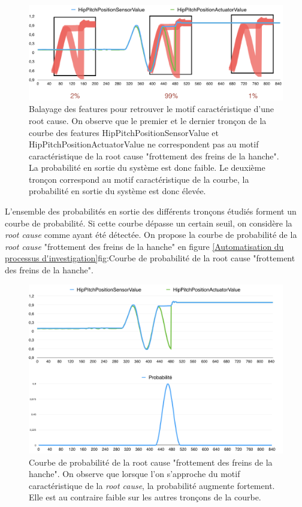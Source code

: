 \begin{figure}[h]
	\centering\includegraphics[width=12cm]{images/balayage_motif.png}
	\caption[Balayage des features pour retrouver le motif caractéristique d'une root cause]{Balayage des features pour retrouver le motif caractéristique d'une root cause. On observe que le premier et le dernier tronçon de la courbe des features HipPitchPositionSensorValue et  HipPitchPositionActuatorValue ne correspondent pas au motif caractéristique de la root cause "frottement des freins de la hanche". La probabilité en sortie du système est donc faible. Le deuxième tronçon correspond au motif caractéristique de la courbe, la probabilité en sortie du système est donc élevée.}
	\label{fig:Balayage des features pour retrouver le motif caractéristique d'une root cause}
\end{figure}

L'ensemble des probabilités en sortie des différents tronçons étudiés forment un courbe de probabilité. Si cette courbe dépasse un certain seuil, on considère la \emph{root cause} comme ayant été détectée. On propose la courbe de probabilité de la \emph{root cause} "frottement des freins de la hanche" en figure 	\ref{Automatisation du processus d'investigation}{fig:Courbe de probabilité de la root cause "frottement des freins de la hanche"}.

\begin{figure}[h]
	\centering\includegraphics[width=12cm]{images/proba_motif.png}
	\caption[Courbe de probabilité de la root cause "frottement des freins de la hanche"]{Courbe de probabilité de la root cause "frottement des freins de la hanche".  On observe que lorsque l'on s'approche du motif caractéristique de la \emph{root cause}, la probabilité augmente fortement. Elle est au contraire faible sur les autres tronçons de la courbe.}
	\label{fig:Représentation de la répartition des exemples et des classes en fonction des features, approche fonctionnelle}
\end{figure}

